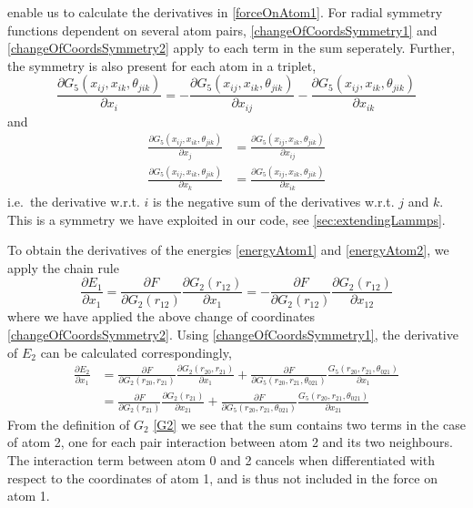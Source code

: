 \documentclass[twoside,english]{uiofysmaster}
\begin{document}
enable us to calculate the derivatives in \eqref{forceOnAtom1}. For radial symmetry functions
dependent on several atom pairs, \eqref{changeOfCoordsSymmetry1} and \eqref{changeOfCoordsSymmetry2} 
apply to each term in the sum seperately. Further, the symmetry is also present for each atom in a triplet,
\begin{equation}
 \frac{\partial G_5(x_{ij}, x_{ik}, \theta_{jik})}{\partial x_i} = 
 -\frac{\partial G_5(x_{ij}, x_{ik}, \theta_{jik})}{\partial x_{ij}} - 
 \frac{\partial G_5(x_{ij}, x_{ik}, \theta_{jik})}{\partial x_{ik}}
 \label{changeOfCoords3body1}
\end{equation}
and 
\begin{subequations}
\begin{align}
 \frac{\partial G_5(x_{ij}, x_{ik}, \theta_{jik})}{\partial x_j} &= 
 \frac{\partial G_5(x_{ij}, x_{ik}, \theta_{jik})}{\partial x_{ij}}
 \label{changeOfCoords3body2} \\
 \frac{\partial G_5(x_{ij}, x_{ik}, \theta_{jik})}{\partial x_k} &= 
 \frac{\partial G_5(x_{ij}, x_{ik}, \theta_{jik})}{\partial x_{ik}}
 \label{changeOfCoords3body3}
\end{align}
\end{subequations}
i.e.\ the derivative w.r.t. $i$ is the negative sum of the derivatives w.r.t. $j$ and $k$. This is a symmetry we
have exploited in our code, see \autoref{sec:extendingLammps}. 

To obtain the derivatives of the energies \eqref{energyAtom1} and \eqref{energyAtom2}, we apply the chain rule
\begin{equation}
 \frac{\partial E_1}{\partial x_1} = \frac{\partial F}{\partial G_2(r_{12})}
 \frac{\partial G_2(r_{12})}{\partial x_1} = 
 -\frac{\partial F}{\partial G_2(r_{12})}\frac{\partial G_2(r_{12})}{\partial x_{12}}
\end{equation}
where we have applied the above change of coordinates \eqref{changeOfCoordsSymmetry2}.
Using \eqref{changeOfCoordsSymmetry1}, the derivative of $E_2$ can be calculated correspondingly,
\begin{subequations}
\begin{align}
 \frac{\partial E_2}{\partial x_1} &= 
 \frac{\partial F}{\partial G_2(r_{20}, r_{21})}\frac{\partial G_2(r_{20}, r_{21})}{\partial x_1} + 
 \frac{\partial F}{\partial G_5(r_{20},r_{21},\theta_{021})}\frac{G_5(r_{20},r_{21},\theta_{021})}{\partial x_1} \\
 &= \frac{\partial F}{\partial G_2(r_{21})}\frac{\partial G_2(r_{21})}{\partial x_{21}} + 
 \frac{\partial F}{\partial G_5(r_{20},r_{21},\theta_{021})}\frac{G_5(r_{20},r_{21},\theta_{021})}{\partial x_{21}}
\end{align}
\end{subequations} 
From the definition of $G_2$ \eqref{G2} we see that the sum contains two terms
in the case of atom 2, one for each pair interaction between atom 2 and its two neighbours. 
The interaction term between atom 0 and 2
cancels when differentiated with respect to the coordinates of atom 1, and is thus not included in the force on atom 1. 
 
\end{document}
